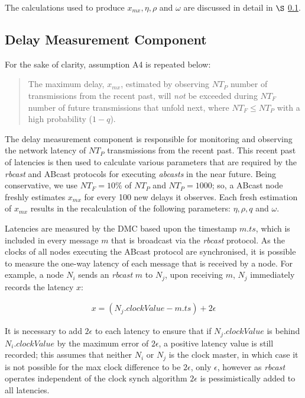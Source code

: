     The calculations used to produce $x_{mx}, \eta, \rho$ and $\omega$ are discussed in detail in $\S$ \ref{ssec:dmc}.  
    
	\subsection{Delay Measurement Component}\label{ssec:dmc}
        For the sake of clarity, assumption A4 is repeated below:	
        
        \begin{quotation}
            The maximum delay, $x_{mx}$, estimated by observing $NT_P$ number of transmissions from the recent past, will \emph{not} be exceeded during $NT_F$ number of future transmissions that unfold next, where $NT_F \leq NT_P$ with a high probability ($1 - q$).
        \end{quotation}
	
        The delay measurement component is responsible for monitoring and observing the network latency of $NT_P$ transmissions from the recent past.  This recent past of latencies is then used to calculate various parameters that are required by the \emph{rbcast} and \textsf{ABcast} protocols for executing \emph{abcasts} in the near future.  Being conservative, we use $NT_F = 10\%$ of $NT_P$ and $NT_P=1000$; so, a \textsf{ABcast} node freshly estimates $x_{mx}$ for every 100 new delays it observes.  Each fresh estimation of $x_{mx}$ results in the recalculation of the following parameters: $\eta, \rho, q$ and $\omega$.  
        
        Latencies are measured by the DMC based upon the timestamp $m.ts$, which is included in every message $m$ that is broadcast via the \emph{rbcast} protocol.  As the clocks of all nodes executing the \textsf{ABcast} protocol are synchronised, it is possible to measure the one-way latency of each message that is received by a node.  For example, a node $N_i$ sends an \emph{rbcast} $m$ to $N_j$, upon receiving $m$, $N_j$ immediately records the latency $x$:

        \begin{equation*}
		     \begin{aligned}
		         x = (N_j.clockValue - m.ts) + 2\epsilon
		     \end{aligned}
        \end{equation*}        
        
        It is necessary to add $2\epsilon$ to each latency to ensure that if $N_j.clockValue$ is behind $N_i.clockValue$ by the maximum error of $2\epsilon$, a positive latency value is still recorded; this assumes that neither $N_i$ or $N_j$ is the clock master, in which case it is not possible for the max clock difference to be $2\epsilon$, only $\epsilon$, however as \emph{rbcast} operates independent of the clock synch algorithm $2\epsilon$ is pessimistically added to all latencies.  
                                
